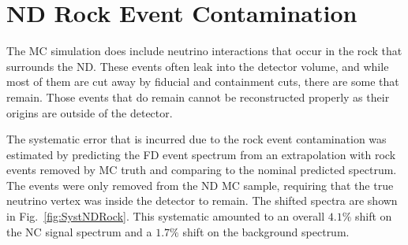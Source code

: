\section{ND Rock Event Contamination}

The MC simulation does include neutrino interactions that occur in the rock that surrounds the ND. These events often leak into the detector volume, and while most of them are cut away by fiducial and containment cuts, there are some that remain. Those events that do remain cannot be reconstructed properly as their origins are outside of the detector. 

The systematic error that is incurred due to the rock event contamination was estimated by predicting the FD event spectrum from an extrapolation with rock events removed by MC truth and comparing to the nominal predicted spectrum. The events were only removed from the ND MC sample, requiring that the true neutrino vertex was inside the detector to remain. The shifted spectra are shown in Fig.~\ref{fig:SystNDRock}. This systematic amounted to an overall $4.1\%$ shift on the NC signal spectrum and a $1.7\%$ shift on the background spectrum.

